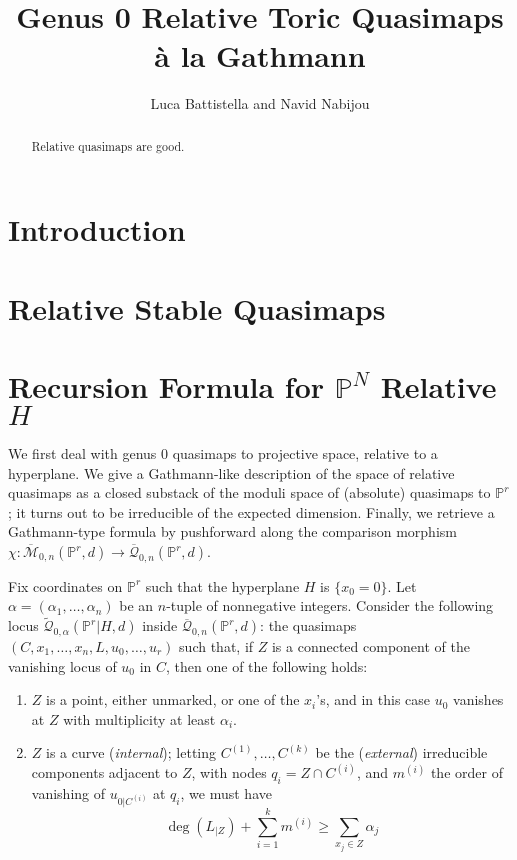 \documentclass[11pt]{amsart}
\title{Genus 0 Relative Toric Quasimaps \`a la Gathmann}
\author{Luca Battistella and Navid Nabijou}
\newcommand{\M}[4]{\overline{\mathcal M}_{#1,#2}(#3,#4)}
\newcommand{\Q}[4]{\overline{\mathcal Q}_{#1,#2}(#3,#4)}
\newcommand{\Qt}[4]{\widetilde{\mathcal Q}_{#1,#2}(#3,#4)}
\newcommand{\PP}{\mathbb P}
\renewcommand{\to}{\rightarrow}
\newcommand{\comp}{\chi}
\theoremstyle{plain}
\theoremstyle{definition}
\begin{document}
\begin{abstract}
Relative quasimaps are good.
\end{abstract}

\maketitle
\tableofcontents

\section{Introduction}

\section{Relative Stable Quasimaps}

\section{Recursion Formula for $\PP^N$ Relative $H$}

We first deal with genus 0 quasimaps to projective space, relative to a hyperplane. We give a Gathmann-like description of the space of relative quasimaps as a closed substack of the moduli space of (absolute) quasimaps to $\PP^r$; it turns out to be irreducible of the expected dimension. Finally, we retrieve a Gathmann-type formula by pushforward along the comparison morphism $\comp\colon \M{0}{n}{\PP^r}{d}\to\Q{0}{n}{\PP^r}{d}$.

Fix coordinates on $\PP^r$ such that the hyperplane $H$ is $\{x_0=0\}$. Let $\alpha=(\alpha_1,\ldots,\alpha_n)$ be an $n$-tuple of nonnegative integers. Consider the following locus $\Qt{0}{\alpha}{\PP^r|H}{d}$ inside $\Q{0}{n}{\PP^r}{d}$: the quasimaps $(C,x_1,\ldots,x_n,L,u_0,\ldots,u_r)$ such that, if $Z$ is a connected component of the vanishing locus of $u_0$ in $C$, then one of the following holds:

\begin{enumerate}
\item $Z$ is a point, either unmarked, or one of the $x_i$'s, and in this case $u_0$ vanishes at $Z$ with multiplicity at least $\alpha_i$.
\item $Z$ is a curve (\emph{internal}); letting $C^{(1)},\ldots,C^{(k)}$ be the (\emph{external}) irreducible components adjacent to $Z$, with nodes $q_i=Z\cap C^{(i)}$, and $m^{(i)}$ the order of vanishing of $u_{0|C^{(i)}}$ at $q_i$, we must have
\[
\deg(L_{|Z})+\sum_{i=1}^k m^{(i)}\geq\sum_{x_j\in Z} \alpha_j
\]
\end{enumerate}
\end{document}
